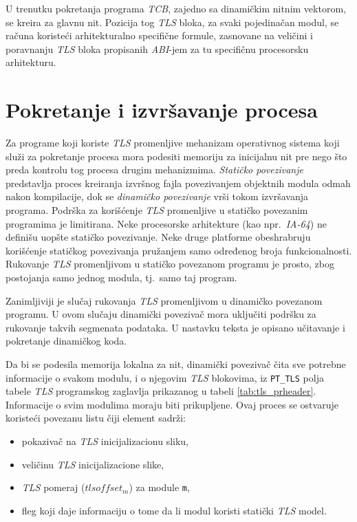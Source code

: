\documentclass[12pt,oneside]{memoir}
\begin{document}
U trenutku pokretanja programa \emph{TCB}, zajedno sa dinamičkim nitnim vektorom, se kreira za glavnu nit. Pozicija tog \emph{TLS} bloka, za svaki pojedinačan modul, se računa koristeći arhitekturalno specifične formule, zasnovane na veličini i poravnanju \emph{TLS} bloka propisanih \emph{ABI}-jem za tu specifičnu procesorsku arhitekturu.

\section{Pokretanje i izvršavanje procesa}
\label{sec:pokrTLS}

Za programe koji koriste \emph{TLS} promenljive mehanizam operativnog sistema koji služi za pokretanje procesa mora podesiti memoriju za inicijalnu nit pre nego što preda kontrolu tog procesa drugim mehanizmima. \emph{Statičko povezivanje} predstavlja proces kreiranja izvršnog fajla povezivanjem objektnih modula odmah nakon kompilacije, dok se \emph{dinamičko povezivanje} vrši tokom izvršavanja programa. Podrška za korišćenje \emph{TLS} promenljive u statičko povezanim programima je limitirana. Neke procesorske arhitekture (kao npr.~\emph{IA-64}) ne definišu uopšte statičko povezivanje. Neke druge platforme obeshrabruju korišćenje statičkog povezivanja pružanjem samo određenog broja funkcionalnosti. Rukovanje \emph{TLS} promenljivom u statičko povezanom programu je prosto, zbog postojanja samo jednog modula, tj.~samo taj program.

Zanimljiviji je slučaj rukovanja \emph{TLS} promenljivom u dinamičko povezanom programu. U ovom slučaju dinamički povezivač mora uključiti podršku za rukovanje takvih segmenata podataka. U nastavku teksta je opisano učitavanje i pokretanje dinamičkog koda.

Da bi se podesila memorija lokalna za nit, dinamički povezivač čita sve potrebne informacije o svakom modulu, i o njegovim \emph{TLS} blokovima, iz \texttt{PT\_TLS} polja tabele \emph{TLS} programskog zaglavlja prikazanog u tabeli \ref{tab:tls_prheader}. Informacije o svim modulima moraju biti prikupljene. Ovaj proces se ostvaruje koristeći povezanu listu čiji element sadrži:

\begin{itemize}
	\item pokazivač na \emph{TLS} inicijalizacionu sliku,
	\item veličinu \emph{TLS} inicijalizacione slike,
	\item \emph{TLS} pomeraj (\texttt{$tlsoffset_m$}) za module \texttt{m},
	\item fleg koji daje informaciju o tome da li modul koristi statički \emph{TLS} model.
\end{itemize}
\end{document}
